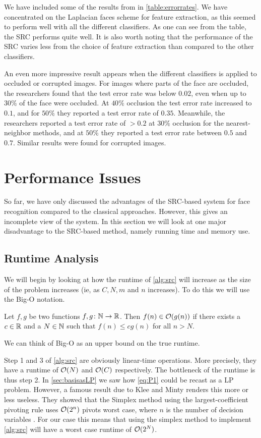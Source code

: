 We have included some of the results from \cite{wright09facerecog} in \cref{table:errorrates}. We have concentrated on the Laplacian faces scheme for feature extraction, as this seemed to perform well with all the different classifiers. As one can see from the table, the SRC performs quite well. It is also worth noting that the performance of the SRC varies less from the choice of feature extraction than compared to the other classifiers.

An even more impressive result appears when the different classifiers is applied to occluded or corrupted images. For images where parts of the face are occluded, the researchers found that the test error rate was below $ 0.02 $, even when up to $ 30\% $ of the face were occluded. At $ 40\% $ occlusion the test error rate increased to $ 0.1 $, and for $ 50\% $ they reported a test error rate of $ 0.35 $. Meanwhile, the researchers reported a test error rate of $ > 0.2 $ at $ 30\% $ occlusion for the nearest-neighbor methods, and at $ 50\% $ they reported a test error rate between $ 0.5 $ and $ 0.7 $. Similar results were found for corrupted images. 




\section{Performance Issues}
So far, we have only discussed the advantages of the SRC-based system for face recognition compared to the classical approaches. However, this gives an incomplete view of the system. In this section we will look at one major disadvantage to the SRC-based method, namely running time and memory use. 

\subsection{Runtime Analysis}
We will begin by looking at how the runtime of \cref{alg:src} will increase as the size of the problem increases (ie, as $ C, N, m $ and $ n $ increases). To do this we will use the Big-O notation.
\begin{definition}
	Let $ f, g $ be two functions $ f, g\colon\mathbb{N}\to\mathbb{R} $. Then $ f(n) \in \mathcal{O}(g(n)) $ if there exists a $ c \in \mathbb{R} $ and a $ N \in \mathbb{N} $ such that $ f(n) \leq cg(n) $ for all $ n > N $.
\end{definition}
\noindent We can think of Big-O as an upper bound on the true runtime.

Step 1 and 3 of \cref{alg:src} are obviously linear-time operations. More precisely, they have a runtime of  $ \mathcal{O}(N) $ and $ \mathcal{O}(C) $ respectively. The bottleneck of the runtime is thus step 2. In \cref{sec:basisasLP} we saw how \eqref{eq:P1} could be recast as a LP problem. However, a famous result due to Klee and Minty renders this more or less useless. They showed that the Simplex method using the largest-coefficient pivoting rule uses $ \mathcal{O}(2^{n}) $ pivots worst case, where $ n $ is the number of decision variables \cite[Section~4.4]{vanderbei14linprog}. For our case this means that using the simplex method to implement \cref{alg:src} will have a worst case runtime of $ \mathcal{O}(2^{N}) $.

